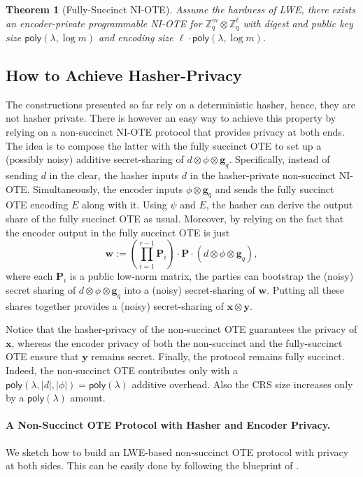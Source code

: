 \documentclass{article}
\newtheorem{theorem}{Theorem}\newtheorem{lemma}[theorem]{Lemma}\newtheorem{proposition}[theorem]{Proposition}\newtheorem{corollary}[theorem]{Corollary}\newtheorem{definition}[theorem]{Definition}\newtheorem{claim}[theorem]{Claim}
\newcommand{\poly}{\mathsf{poly}}
\renewcommand{\sec}{\ensuremath{\lambda}}
\begin{document}
{

\begin{theorem}[Fully-Succinct NI-OTE]
Assume the hardness of LWE, there exists an
encoder-private programmable NI-OTE for
$\mathbb Z_q^m \otimes \mathbb Z_q^\ell$ with digest and public key size $\poly(\lambda,\log m)$ and encoding size $\ell \cdot \poly(\lambda,\log m)$.
\end{theorem}

}
{
\subsection{How to Achieve Hasher-Privacy}
The constructions presented so far rely on a deterministic hasher, hence, they are not hasher private. There is however an easy way to achieve this property by relying on a non-succinct NI-OTE protocol that provides privacy at both ends. The idea is to compose the latter with the fully succinct OTE to set up a (possibly noisy) additive secret-sharing of $d\otimes \phi\otimes \mathbf{g}_q$. Specifically, instead of sending $d$ in the clear, the hasher inputs $d$ in the hasher-private non-succinct NI-OTE. Simultaneously, the encoder inputs $\phi\otimes \mathbf{g}_q$ and sends the fully succinct OTE encoding $E$ along with it. Using $\psi$ and $E$, the hasher can derive the output share of the fully succinct OTE as usual. Moreover, by relying on the fact that the encoder output in the fully succinct OTE is just
\[\mathbf{w}:=\left(\prod_{i=1}^{r-1}\mathbf{P}_i\right)\cdot \mathbf{P} \cdot (d\otimes \phi\otimes \mathbf{g}_q),\]
where each $\mathbf{P}_i$ is  a public low-norm matrix, the parties can bootstrap the (noisy) secret sharing of $d\otimes \phi\otimes \mathbf{g}_q$ into a (noisy) secret-sharing of $\mathbf{w}$. Putting all these shares together provides a (noisy) secret-sharing of $\mathbf{x}\otimes \mathbf{y}$.}

{
Notice that the hasher-privacy of the non-succinct OTE guarantees the privacy of $\mathbf{x}$, whereas the encoder privacy of both the non-succinct and the fully-succinct OTE ensure that $\mathbf{y}$ remains secret. Finally, the protocol remains fully succinct. Indeed, the non-succinct OTE contributes only with a $\poly(\sec, \lvert d\rvert, \lvert \phi\rvert)=\poly(\sec)$ additive overhead. Also the CRS size increases only by a $\poly(\sec)$ amount.}

{
\paragraph{A Non-Succinct OTE Protocol with Hasher and Encoder Privacy.} We sketch how to build an LWE-based non-succinct OTE protocol with privacy at both sides. This can be easily done by following the blueprint of \cite{EC:OrlSchYak21,C:ADOS22,EC:AbrRoySch24}.}
\end{document}
